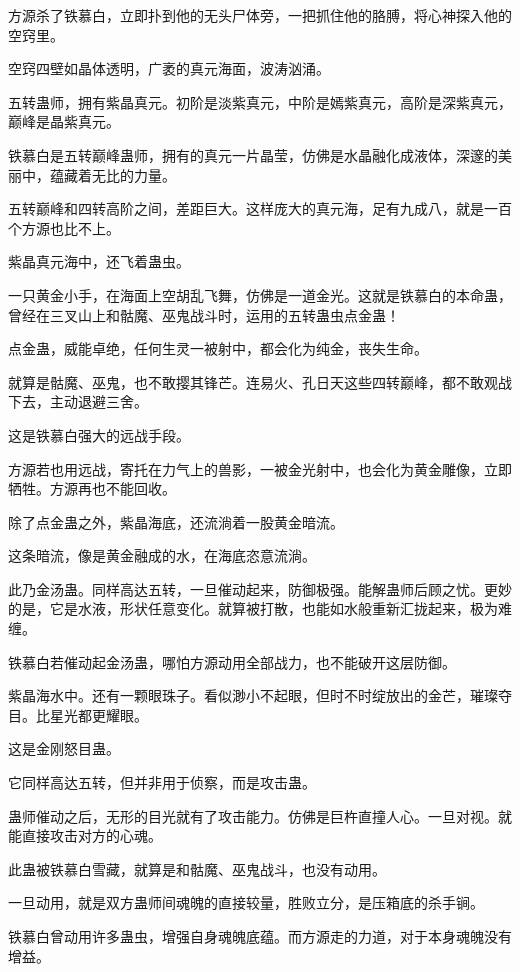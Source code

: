
\begin{this_body}

方源杀了铁慕白，立即扑到他的无头尸体旁，一把抓住他的胳膊，将心神探入他的空窍里。

空窍四壁如晶体透明，广袤的真元海面，波涛汹涌。

五转蛊师，拥有紫晶真元。初阶是淡紫真元，中阶是嫣紫真元，高阶是深紫真元，巅峰是晶紫真元。

铁慕白是五转巅峰蛊师，拥有的真元一片晶莹，仿佛是水晶融化成液体，深邃的美丽中，蕴藏着无比的力量。

五转巅峰和四转高阶之间，差距巨大。这样庞大的真元海，足有九成八，就是一百个方源也比不上。

紫晶真元海中，还飞着蛊虫。

一只黄金小手，在海面上空胡乱飞舞，仿佛是一道金光。这就是铁慕白的本命蛊，曾经在三叉山上和骷魔、巫鬼战斗时，运用的五转蛊虫点金蛊！

点金蛊，威能卓绝，任何生灵一被射中，都会化为纯金，丧失生命。

就算是骷魔、巫鬼，也不敢撄其锋芒。连易火、孔日天这些四转巅峰，都不敢观战下去，主动退避三舍。

这是铁慕白强大的远战手段。

方源若也用远战，寄托在力气上的兽影，一被金光射中，也会化为黄金雕像，立即牺牲。方源再也不能回收。

除了点金蛊之外，紫晶海底，还流淌着一股黄金暗流。

这条暗流，像是黄金融成的水，在海底恣意流淌。

此乃金汤蛊。同样高达五转，一旦催动起来，防御极强。能解蛊师后顾之忧。更妙的是，它是水液，形状任意变化。就算被打散，也能如水般重新汇拢起来，极为难缠。

铁慕白若催动起金汤蛊，哪怕方源动用全部战力，也不能破开这层防御。

紫晶海水中。还有一颗眼珠子。看似渺小不起眼，但时不时绽放出的金芒，璀璨夺目。比星光都更耀眼。

这是金刚怒目蛊。

它同样高达五转，但并非用于侦察，而是攻击蛊。

蛊师催动之后，无形的目光就有了攻击能力。仿佛是巨杵直撞人心。一旦对视。就能直接攻击对方的心魂。

此蛊被铁慕白雪藏，就算是和骷魔、巫鬼战斗，也没有动用。

一旦动用，就是双方蛊师间魂魄的直接较量，胜败立分，是压箱底的杀手锏。

铁慕白曾动用许多蛊虫，增强自身魂魄底蕴。而方源走的力道，对于本身魂魄没有增益。


\end{this_body}
